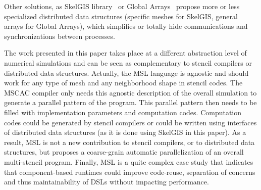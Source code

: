 Other solutions, as SkelGIS library~\cite{CPE:CPE3494} or Global Arrays~\cite{Nieplocha:2006:AAP:1125980.1125985} propose more or less specialized distributed data structures (specific meshes for SkelGIS, general arrays for Global Arrays), which simplifies or totally hide communications and synchronizations between processes.

The work presented in this paper takes place at a different abstraction level of numerical simulations and can be seen as complementary to stencil compilers or distributed data structures. Actually, the MSL language is agnostic and should work for any type of mesh and any neighborhood shape in stencil codes. The MSCAC compiler only needs this agnostic description of the overall simulation to generate a parallel pattern of the program. This parallel pattern then needs to be filled with implementation parameters and computation codes.
Computation codes could be generated by stencil compilers or could be written using interfaces of distributed data structures (as it is done using SkelGIS in this paper). As a result, MSL is not a new contribution to stencil compilers, or to distributed data structures, but proposes a coarse-grain automatic parallelization of an overall multi-stencil program.
Finally, MSL is a quite complex case study that indicates that component-based runtimes could improve code-reuse, separation of concerns and thus maintainability of DSLs without impacting performance. 




